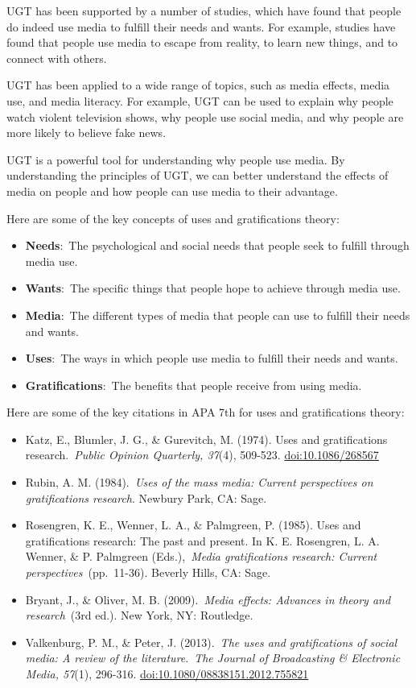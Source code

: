 \documentclass[
  b5paper]{book}
\begin{document}
UGT has been supported by a number of studies, which have found that people do indeed use media to fulfill their needs and wants. For example, studies have found that people use media to escape from reality, to learn new things, and to connect with others.

UGT has been applied to a wide range of topics, such as media effects, media use, and media literacy. For example, UGT can be used to explain why people watch violent television shows, why people use social media, and why people are more likely to believe fake news.

UGT is a powerful tool for understanding why people use media. By understanding the principles of UGT, we can better understand the effects of media on people and how people can use media to their advantage.

Here are some of the key concepts of uses and gratifications theory:

\begin{itemize}
\item
  \textbf{Needs}:~The psychological and social needs that people seek to fulfill through media use.
\item
  \textbf{Wants}:~The specific things that people hope to achieve through media use.
\item
  \textbf{Media}:~The different types of media that people can use to fulfill their needs and wants.
\item
  \textbf{Uses}:~The ways in which people use media to fulfill their needs and wants.
\item
  \textbf{Gratifications}:~The benefits that people receive from using media.
\end{itemize}

Here are some of the key citations in APA 7th for uses and gratifications theory:

\begin{itemize}
\item
  Katz, E., Blumler, J. G., \& Gurevitch, M. (1974). Uses and gratifications research.~\emph{Public Opinion Quarterly, 37}(4), 509-523. \url{doi:10.1086/268567}
\item
  Rubin, A. M. (1984).~\emph{Uses of the mass media: Current perspectives on gratifications research}. Newbury Park, CA: Sage.
\item
  Rosengren, K. E., Wenner, L. A., \& Palmgreen, P. (1985). Uses and gratifications research: The past and present. In K. E. Rosengren, L. A. Wenner, \& P. Palmgreen (Eds.),~\emph{Media gratifications research: Current perspectives}~(pp.~11-36). Beverly Hills, CA: Sage.
\item
  Bryant, J., \& Oliver, M. B. (2009).~\emph{Media effects: Advances in theory and research}~(3rd ed.). New York, NY: Routledge.
\item
  Valkenburg, P. M., \& Peter, J. (2013).~\emph{The uses and gratifications of social media: A review of the literature}.~\emph{The Journal of Broadcasting \& Electronic Media, 57}(1), 296-316. \url{doi:10.1080/08838151.2012.755821}
\end{itemize}
\end{document}

